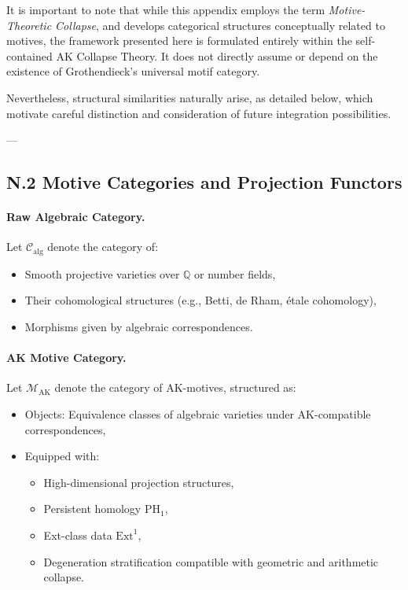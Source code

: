 \documentclass[11pt]{article}
\begin{document}
It is important to note that while this appendix employs the term \textit{Motive-Theoretic Collapse}, and develops categorical structures conceptually related to motives, the framework presented here is formulated entirely within the self-contained AK Collapse Theory. It does not directly assume or depend on the existence of Grothendieck's universal motif category.

Nevertheless, structural similarities naturally arise, as detailed below, which motivate careful distinction and consideration of future integration possibilities.

---

\subsection*{N.2 Motive Categories and Projection Functors}

\paragraph{Raw Algebraic Category.}
Let \( \mathcal{C}_{\mathrm{alg}} \) denote the category of:
\begin{itemize}
  \item Smooth projective varieties over \( \mathbb{Q} \) or number fields,
  \item Their cohomological structures (e.g., Betti, de Rham, étale cohomology),
  \item Morphisms given by algebraic correspondences.
\end{itemize}

\paragraph{AK Motive Category.}
Let \( \mathcal{M}_{\mathrm{AK}} \) denote the category of AK-motives, structured as:
\begin{itemize}
  \item Objects: Equivalence classes of algebraic varieties under AK-compatible correspondences,
  \item Equipped with:
  \begin{itemize}
    \item High-dimensional projection structures,
    \item Persistent homology \( \mathrm{PH}_1 \),
    \item Ext-class data \( \mathrm{Ext}^1 \),
    \item Degeneration stratification compatible with geometric and arithmetic collapse.
  \end{itemize}
\end{itemize}
\end{document}
